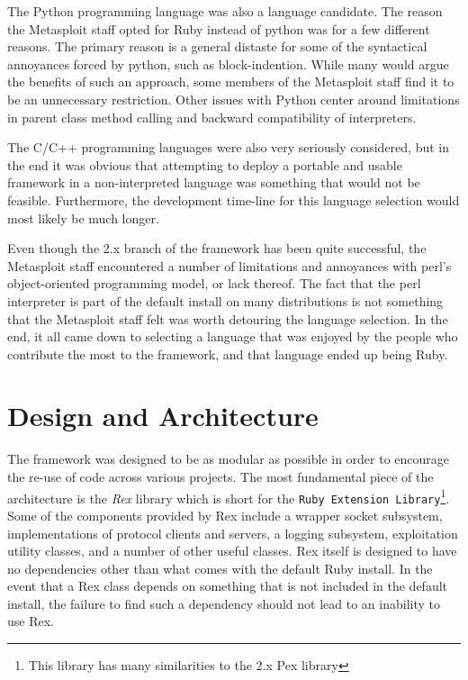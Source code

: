 \documentclass{report}
\begin{document}
\par
The Python programming language was also a language candidate. The
reason the Metasploit staff opted for Ruby instead of python was for
a few different reasons.  The primary reason is a general distaste
for some of the syntactical annoyances forced by python, such as
block-indention.  While many would argue the benefits of such an
approach, some members of the Metasploit staff find it to be an
unnecessary restriction.  Other issues with Python center around
limitations in parent class method calling and backward
compatibility of interpreters.

\par
The C/C++ programming languages were also very seriously considered,
but in the end it was obvious that attempting to deploy a portable
and usable framework in a non-interpreted language was something
that would not be feasible.  Furthermore, the development time-line
for this language selection would most likely be much longer.

\par
Even though the 2.x branch of the framework has been quite
successful, the Metasploit staff encountered a number of limitations
and annoyances with perl's object-oriented programming model, or
lack thereof.  The fact that the perl interpreter is part of the
default install on many distributions is not something that the
Metasploit staff felt was worth detouring the language selection. In
the end, it all came down to selecting a language that was enjoyed
by the people who contribute the most to the framework, and that
language ended up being Ruby.

    \section{Design and Architecture}

\par
The framework was designed to be as modular as possible in order to
encourage the re-use of code across various projects.  The most
fundamental piece of the architecture is the \textit{Rex} library
which is short for the \texttt{Ruby Extension Library}\footnote{This
library has many similarities to the 2.x Pex library}. Some of the
components provided by Rex include a wrapper socket subsystem,
implementations of protocol clients and servers, a logging
subsystem, exploitation utility classes, and a number of other
useful classes.  Rex itself is designed to have no dependencies
other than what comes with the default Ruby install. In the event
that a Rex class depends on something that is not included in the
default install, the failure to find such a dependency should not
lead to an inability to use Rex.
\end{document}
